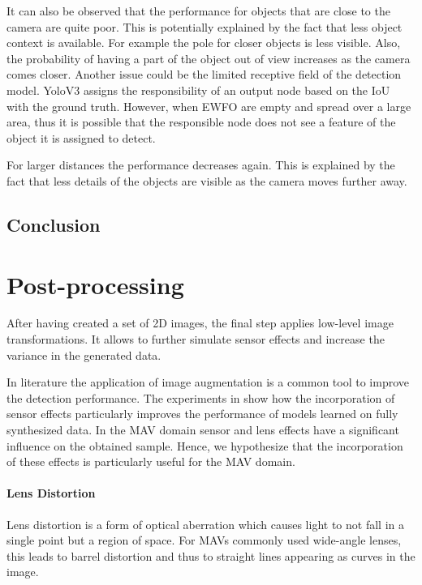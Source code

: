 It can also be observed that the performance for objects that are close to the camera are quite poor. This is potentially explained by the fact that less object context is available. For example the pole for closer objects is less visible. Also, the probability of having a part of the object out of view increases as the camera comes closer. Another issue could be the limited receptive field of the detection model. YoloV3 assigns the responsibility of an output node based on the \ac{IoU} with the ground truth. However, when \ac{EWFO} are empty and spread over a large area, thus it is possible that the responsible node does not see a feature of the object it is assigned to detect.

For larger distances the performance decreases again. This is explained by the fact that less details of the objects are visible as the camera moves further away.


\subsection{Conclusion}


\section{Post-processing}

After having created a set of 2D images, the final step applies low-level image transformations. It allows to further simulate sensor effects and increase the variance in the generated data.

In literature \cite{Krizhevsky2012a,Howard2013,Redmon,Liu} the application of image augmentation is a common tool to improve the detection performance. The experiments in \cite{Carlson2018} show how the incorporation of sensor effects particularly improves the performance of models learned on fully synthesized data. In the \ac{MAV} domain sensor and lens effects have a significant influence on the obtained sample. Hence, we hypothesize that the incorporation of these effects is particularly useful for the \ac{MAV} domain.

\paragraph{Lens Distortion}

Lens distortion is a form of optical aberration which causes light to not fall in a single point but a region of space. For \acp{MAV} commonly used wide-angle lenses, this leads to barrel distortion and thus to straight lines appearing as curves in the image.

